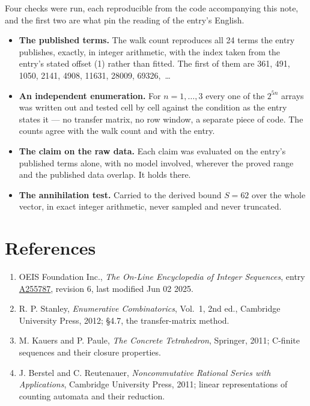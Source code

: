 \documentclass[11pt]{article}
\theoremstyle{definition}
\begin{document}
Four checks were run, each reproducible from the code accompanying this note, and the first two are what pin the reading of the entry's English.

\begin{itemize}

\item {\bfseries The published terms.} The walk count reproduces all 24 terms the entry publishes, exactly, in integer arithmetic, with the index taken from the entry's stated offset (1) rather than fitted. The first of them are 361, 491, 1050, 2141, 4908, 11631, 28009, 69326,~\dots

\item {\bfseries An independent enumeration.} For $n = 1,\dots,3$ every one of the $2^{5n}$ arrays was written out and tested cell by cell against the condition as the entry states it --- no transfer matrix, no row window, a separate piece of code. The counts agree with the walk count and with the entry.

\item {\bfseries The claim on the raw data.} Each claim was evaluated on the entry's published terms alone, with no model involved, wherever the proved range and the published data overlap. It holds there.

\item {\bfseries The annihilation test.} Carried to the derived bound $S = 62$ over the whole vector, in exact integer arithmetic, never sampled and never truncated.

\end{itemize}

\section{References}

\begin{enumerate}

\item OEIS Foundation Inc., \emph{The On-Line Encyclopedia of Integer Sequences}, entry \href{https://oeis.org/A255787}{A255787}, revision 6, last modified Jun 02 2025.

\item R. P. Stanley, \emph{Enumerative Combinatorics}, Vol.~1, 2nd ed., Cambridge University Press, 2012; \S4.7, the transfer-matrix method.

\item M. Kauers and P. Paule, \emph{The Concrete Tetrahedron}, Springer, 2011; C-finite sequences and their closure properties.

\item J. Berstel and C. Reutenauer, \emph{Noncommutative Rational Series with Applications}, Cambridge University Press, 2011; linear representations of counting automata and their reduction.

\end{enumerate}
\end{document}
